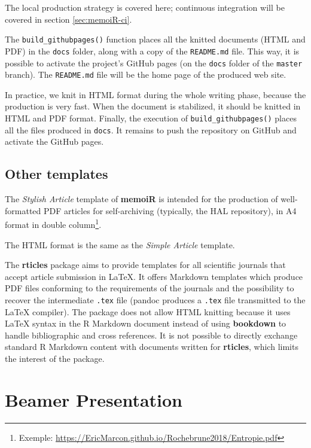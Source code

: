 \documentclass[
  12pt,
  american,
  a4paper,
  extrafontsizes,onecolumn,openright
  ]{memoir}
\begin{document}
The local production strategy is covered here; continuous integration will be covered in section \ref{sec:memoiR-ci}.

The \texttt{build\_githubpages()} function places all the knitted documents (HTML and PDF) in the \texttt{docs} folder, along with a copy of the \texttt{README.md} file.
This way, it is possible to activate the project's GitHub pages (on the \texttt{docs} folder of the \texttt{master} branch).
The \texttt{README.md} file will be the home page of the produced web site.

In practice, we knit in HTML format during the whole writing phase, because the production is very fast.
When the document is stabilized, it should be knitted in HTML and PDF format.
Finally, the execution of \texttt{build\_githubpages()} places all the files produced in \texttt{docs}.
It remains to push the repository on GitHub and activate the GitHub pages.

\hypertarget{other-templates}{%
\subsection{Other templates}\label{other-templates}}

The \emph{Stylish Article} template of \textbf{memoiR} is intended for the production of well-formatted PDF articles for self-archiving (typically, the HAL repository), in A4 format in double column\footnote{Exemple: \url{https://EricMarcon.github.io/Rochebrune2018/Entropie.pdf}}.

The HTML format is the same as the \emph{Simple Article} template.

The \textbf{rticles} package aims to provide templates for all scientific journals that accept article submission in LaTeX.
It offers Markdown templates which produce PDF files conforming to the requirements of the journals and the possibility to recover the intermediate \texttt{.tex} file (pandoc produces a \texttt{.tex} file transmitted to the LaTeX compiler).
The package does not allow HTML knitting because it uses LaTeX syntax in the R Markdown document instead of using \textbf{bookdown} to handle bibliographic and cross references.
It is not possible to directly exchange standard R Markdown content with documents written for \textbf{rticles}, which limits the interest of the package.

\hypertarget{beamer-presentation}{%
\section{Beamer Presentation}\label{beamer-presentation}}
\end{document}
